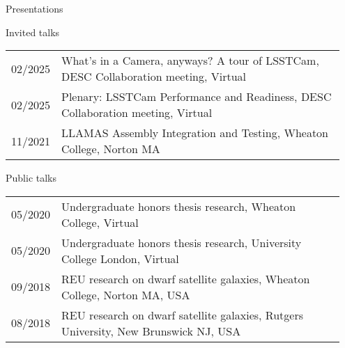\documentclass{resume} %
\begin{document}


\begin{rSection}{Presentations}

\begin{rSubsection}{Invited talks}{}{}{}
    \begin{table}[h]
\begin{tabular}{p{0.07\linewidth} p{0.88\linewidth}}
02/2025 & What's in a Camera, anyways? A tour of LSSTCam, DESC Collaboration meeting, Virtual\\
02/2025 & Plenary: LSSTCam Performance and Readiness, DESC Collaboration meeting, Virtual\\
11/2021 & LLAMAS Assembly Integration and Testing, Wheaton College, Norton MA\\
\end{tabular}
\end{table}
\end{rSubsection}

\begin{rSubsection}{Public talks}{}{}{}
    \begin{table}[h]
\begin{tabular}{p{0.07\linewidth} p{0.88\linewidth}}
05/2020 & Undergraduate honors thesis research, Wheaton College, Virtual\\ 
05/2020 & Undergraduate honors thesis research, University College London, Virtual\\
09/2018 & REU research on dwarf satellite galaxies, Wheaton College, Norton MA, USA\\
08/2018 & REU research on dwarf satellite galaxies, Rutgers University, New Brunswick NJ, USA\\
\end{tabular}
\end{table}
\end{rSubsection}


\end{rSection}
\end{document}

